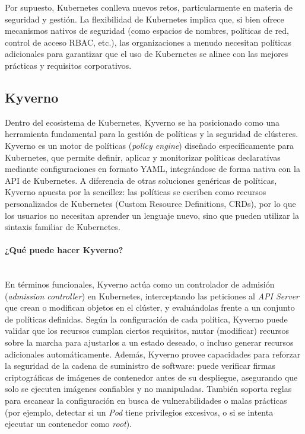 \documentclass[12pt,twoside,titlepage]{report}
\begin{document}
Por supuesto, Kubernetes conlleva nuevos retos, particularmente en materia de seguridad y gestión. La flexibilidad de Kubernetes implica que, si bien ofrece mecanismos nativos de seguridad (como espacios de nombres, políticas de red, control de acceso RBAC, etc.), las organizaciones a menudo necesitan políticas adicionales para garantizar que el uso de Kubernetes se alinee con las mejores prácticas y requisitos corporativos.

\subsection{Kyverno}
Dentro del ecosistema de Kubernetes, Kyverno se ha posicionado como una herramienta fundamental para la gestión de políticas y la seguridad de clústeres. Kyverno es un motor de políticas (\textit{policy engine}) diseñado específicamente para Kubernetes, que permite definir, aplicar y monitorizar políticas declarativas mediante configuraciones en formato YAML, integrándose de forma nativa con la API de Kubernetes. A diferencia de otras soluciones genéricas de políticas, Kyverno apuesta por la sencillez: las políticas se escriben como recursos personalizados de Kubernetes (Custom Resource Definitions, CRDs), por lo que los usuarios no necesitan aprender un lenguaje nuevo, sino que pueden utilizar la sintaxis familiar de Kubernetes.

\paragraph{¿Qué puede hacer Kyverno? \\ \\}

En términos funcionales, Kyverno actúa como un controlador de admisión (\textit{admission controller}) en Kubernetes, interceptando las peticiones al \textit{API Server} que crean o modifican objetos en el clúster, y evaluándolas frente a un conjunto de políticas definidas. Según la configuración de cada política, Kyverno puede validar que los recursos cumplan ciertos requisitos, mutar (modificar) recursos sobre la marcha para ajustarlos a un estado deseado, o incluso generar recursos adicionales automáticamente. Además, Kyverno provee capacidades para reforzar la seguridad de la cadena de suministro de software: puede verificar firmas criptográficas de imágenes de contenedor antes de su despliegue, asegurando que solo se ejecuten imágenes confiables y no manipuladas. También soporta reglas para escanear la configuración en busca de vulnerabilidades o malas prácticas (por ejemplo, detectar si un \textit{Pod} tiene privilegios excesivos, o si se intenta ejecutar un contenedor como \textit{root}).
\end{document}
